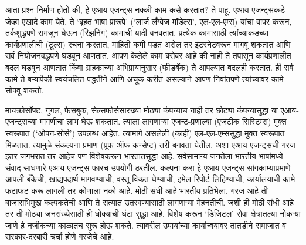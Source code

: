 आता प्रश्न निर्माण होतो की, हे एआय-एजन्ट्स नक्की काम कसे करतात? ते पाहू. एआय-एजन्ट्सकडे जेव्हा एखादे काम येते, ते `बृहत भाषा प्रारूपे' (`लार्ज लँग्वेज मॉडेल्स', एल-एल-एम्स) यांचा वापर करून, तर्कशुद्धपणे समजून घेऊन (रिझनिंग) कामाची यादी बनवतात. प्रत्येक कामासाठी त्यांच्याकडच्या कार्यप्रणालींची (टूल्स) रचना करतात, माहिती कमी पडत असेल तर इंटरनेटवरून  मागवू शकतात आणि सर्व नियोजनबद्धपणे घडवून आणतात. आपण केलेले काम बरोबर आहे की नाही ते तपासून कार्यप्रणालीत बदल घडवून आणतात किंवा ग्राहकाच्या अभिप्रायानुसार (फीडबॅक) ते आपल्यात बदलही करतात. ही सर्व कामे ते बऱ्यापैकी स्वयंचलित पद्धतीने आणि अचूक करीत असल्याने आपण निवांतपणे त्यांच्यावर कामे सोपवू शकतो. 

मायक्रोसॉफ्ट, गुगल, फेसबुक, सेल्सफोर्ससारख्या मोठ्या कंपन्याच नाही तर छोट्या कंपन्यासुद्धा या एआय-एजन्ट्सच्या मागणीचा लाभ घेऊ शकतात. त्याला लागणाऱ्या एजन्ट-प्रणाल्या (एजंटीक सिस्टिम्स) मुक्त स्वरूपात (`ओपन-सोर्स') उपलब्ध आहेत. त्यामागे असलेली (काही)  एल-एल-एम्ससुद्धा मुक्त स्वरूपात मिळतात. त्यामुळे संकल्पना-प्रमाण (प्रूफ-ऑफ-कन्सेप्ट) तरी बनवता येतील. अशा एआय एजन्ट्सची गरज इतर जगभरात तर आहेच पण विशेषकरून भारतातसुद्धा आहे. सर्वसामान्य जनतेला भारतीय भाषांमध्ये संवाद साधणारे एआय-एजन्ट्स  फारच उपयोगी ठरतील. कल्पना करा हे एआय-एजन्ट्स सांगकाम्याप्रमाणे आपली बँकेची, खाद्यपदार्थ मागवण्याची, वस्तू विकत घेण्याची, इमेल-रिपोर्ट लिहिण्याची, कार्यालयाची कामे फटाफट करू लागली तर कोणाला नको आहे. मोठी संधी आहे भारतीय प्रतिभेला. गरज आहे ती बाजाराभिमुख कल्पकतेची आणि ते सत्यात उतरवण्यासाठी लागणाऱ्या मेहनतीची. जशी ही मोठी संधी आहे तर ती मोठ्या जनसंख्येसाठी ही धोक्याची घंटा सुद्धा आहे. विशेष करून `डिजिटल' सेवा क्षेत्रातल्या नोकऱ्या जाणे हे नजीकच्या काळातच सुरू होऊ शकते.  त्यावरील उपायांच्या कार्यान्वयावर तातडीने समाजात व सरकार-दरबारी चर्चा होणे गरजेचे आहे. 
